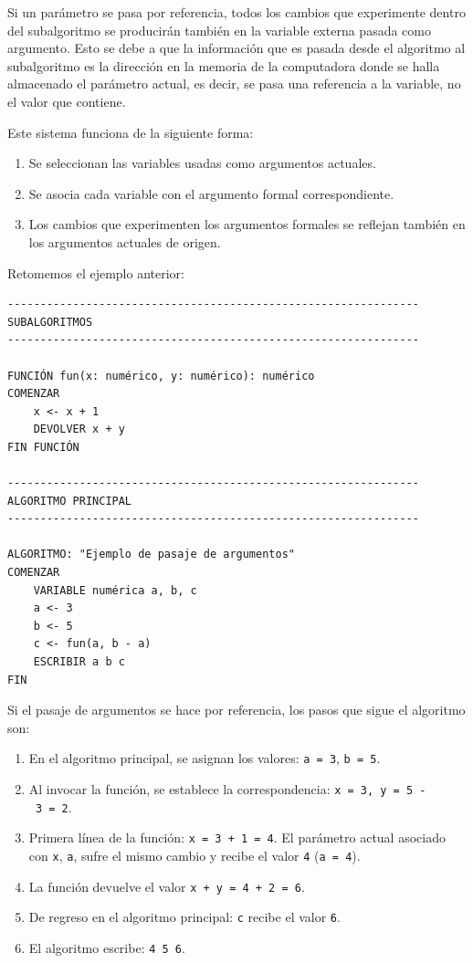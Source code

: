\documentclass[
]{book}
\providecommand{\tightlist}{%
  \setlength{\itemsep}{0pt}\setlength{\parskip}{0pt}}
\begin{document}
Si un parámetro se pasa por referencia, todos los cambios que experimente dentro del subalgoritmo se producirán también en la variable externa pasada como argumento. Esto se debe a que la información que es pasada desde el algoritmo al subalgoritmo es la dirección en la memoria de la computadora donde se halla almacenado el parámetro actual, es decir, se pasa una referencia a la variable, no el valor que contiene.

Este sistema funciona de la siguiente forma:

\begin{enumerate}
\def\labelenumi{\arabic{enumi}.}
\tightlist
\item
  Se seleccionan las variables usadas como argumentos actuales.
\item
  Se asocia cada variable con el argumento formal correspondiente.
\item
  Los cambios que experimenten los argumentos formales se reflejan también en los argumentos actuales de origen.
\end{enumerate}

Retomemos el ejemplo anterior:

\begin{verbatim}
---------------------------------------------------------------
SUBALGORITMOS
---------------------------------------------------------------

FUNCIÓN fun(x: numérico, y: numérico): numérico
COMENZAR
    x <- x + 1
    DEVOLVER x + y
FIN FUNCIÓN

---------------------------------------------------------------
ALGORITMO PRINCIPAL
---------------------------------------------------------------

ALGORITMO: "Ejemplo de pasaje de argumentos"
COMENZAR
    VARIABLE numérica a, b, c
    a <- 3
    b <- 5
    c <- fun(a, b - a)
    ESCRIBIR a b c
FIN
\end{verbatim}

Si el pasaje de argumentos se hace por referencia, los pasos que sigue el algoritmo son:

\begin{enumerate}
\def\labelenumi{\arabic{enumi}.}
\tightlist
\item
  En el algoritmo principal, se asignan los valores: \texttt{a\ =\ 3}, \texttt{b\ =\ 5}.
\item
  Al invocar la función, se establece la correspondencia: \texttt{x\ =\ 3,\ y\ =\ 5\ -\ 3\ =\ 2}.
\item
  Primera línea de la función: \texttt{x\ =\ 3\ +\ 1\ =\ 4}. El parámetro actual asociado con \texttt{x}, \texttt{a}, sufre el mismo cambio y recibe el valor \texttt{4} (\texttt{a\ =\ 4}).
\item
  La función devuelve el valor \texttt{x\ +\ y\ =\ 4\ +\ 2\ =\ 6}.
\item
  De regreso en el algoritmo principal: \texttt{c} recibe el valor \texttt{6}.
\item
  El algoritmo escribe: \texttt{4\ 5\ 6}.
\end{enumerate}
\end{document}
